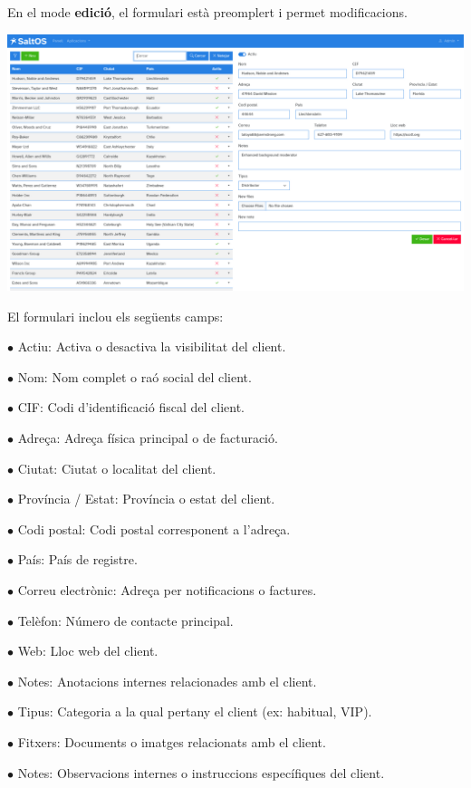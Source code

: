 \documentclass[a4paper]{article}
\begin{document}
En el mode \textbf{edició}, el formulari està preomplert i permet modificacions.

\begin{center}\includegraphics[width=1\textwidth]{../ujest/snaps/test-screenshots-js-screenshots-crm-customers-edit-100-ca-es-1-snap.png}\end{center}

El formulari inclou els següents camps:

\begin{compactitem}
\item[\color{myblue}$\bullet$] Actiu: Activa o desactiva la visibilitat del client.
\item[\color{myblue}$\bullet$] Nom: Nom complet o raó social del client.
\item[\color{myblue}$\bullet$] CIF: Codi d'identificació fiscal del client.
\item[\color{myblue}$\bullet$] Adreça: Adreça física principal o de facturació.
\item[\color{myblue}$\bullet$] Ciutat: Ciutat o localitat del client.
\item[\color{myblue}$\bullet$] Província / Estat: Província o estat del client.
\item[\color{myblue}$\bullet$] Codi postal: Codi postal corresponent a l'adreça.
\item[\color{myblue}$\bullet$] País: País de registre.
\item[\color{myblue}$\bullet$] Correu electrònic: Adreça per notificacions o factures.
\item[\color{myblue}$\bullet$] Telèfon: Número de contacte principal.
\item[\color{myblue}$\bullet$] Web: Lloc web del client.
\item[\color{myblue}$\bullet$] Notes: Anotacions internes relacionades amb el client.
\item[\color{myblue}$\bullet$] Tipus: Categoria a la qual pertany el client (ex: habitual, VIP).
\item[\color{myblue}$\bullet$] Fitxers: Documents o imatges relacionats amb el client.
\item[\color{myblue}$\bullet$] Notes: Observacions internes o instruccions específiques del client.
\end{compactitem}
\end{document}
